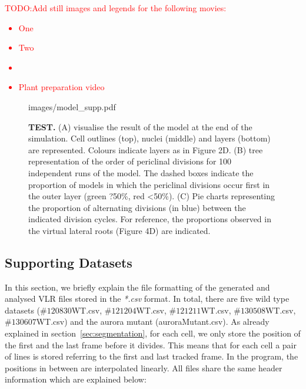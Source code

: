 \documentclass[11pt,a4paper, draft]{article}
\newcommand{\TODO}[1]{
\textcolor{red}{TODO:#1}
}
\begin{document}
%
\TODO{Add still images and legends for the following movies:
\begin{itemize}
  \item One
  \item Two
  \item 
  \item Plant preparation video
\end{itemize}
}
\begin{figure}[htbp]
	\begin{center}
	\begin{overpic}[width=1.\linewidth]{images/model_supp.pdf}
	\end{overpic}
\caption[Model of lateral root formation with random choice of division plane and  generation of  daughter cells of equal surface.]
{{\bf TEST.} (A) visualise the result of the model at the end of the simulation. Cell outlines (top), nuclei (middle) and layers (bottom) are represented. Colours indicate layers as in Figure 2D. (B)  tree representation of the order of periclinal divisions for 100 independent runs of the model. The dashed boxes indicate the proportion of models in which the periclinal divisions occur first in the outer layer (green ?50\%, red <50\%). (C) Pie charts representing the proportion of alternating divisions (in blue) between the indicated division cycles. For reference, the proportions observed in the virtual lateral roots (Figure 4D) are indicated. }
\label{fig:modelrandea}
\end{center}
\end{figure}

\clearpage
\subsection{Supporting Datasets}
\noindent
In this section, we briefly explain the file formatting of the generated and analysed VLR files stored in the \textit{*.csv} format. In total, there are five wild type datasets ($\#120830$WT.csv, $\#121204$WT.csv, $\#121211$WT.csv,  $\#130508$WT.csv, $\#130607$WT.csv) and the aurora mutant (auroraMutant.csv). As already explained in section~\ref{sec:segmentation}, for each cell, we only store the position of the first and the last frame before it divides. This means that for each cell a pair of lines is stored referring to the first and last tracked frame. In the program, the positions in between are interpolated linearly. All files share the same header information which are explained below:
\end{document}
